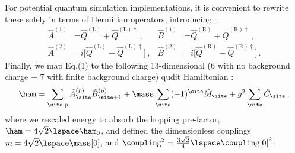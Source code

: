 \documentclass[aps,prl,reprint,twocolumn,superscriptaddress,floatfix,nofootinbib]{revtex4-2}
\begin{document}
For potential quantum simulation implementations, it is convenient to rewrite these solely in terms of Hermitian operators, introducing \cite{Calajo2024DigitalQuantumSimulation}:
\begin{equation}
    \begin{aligned}
        \hat{A}^{(1)} & \mathbin=\hat{Q}^{\mathrm{(L)}} \mathop+ \hat{Q}^{\mathrm{(L)}\dagger}\,,                 &
        \hat{B}^{(1)} & \mathbin=\hat{Q}^{\mathrm{(R)}} \mathop+ \hat{Q}^{\mathrm{(R)}\dagger}\,,                   \\
        \hat{A}^{(2)} & \mathbin= i \big[ \hat{Q}^{\mathrm{(L)}} \mathop- \hat{Q}^{\mathrm{(L)}\dagger} \big] \,, &
        \hat{B}^{(2)} & \mathbin= i \big[ \hat{Q}^{\mathrm{(R)}} \mathop- \hat{Q}^{\mathrm{(R)}\dagger} \big] \,.
    \end{aligned}
\end{equation}
Finally, we map Eq.(1) to the following 13-dimensional (6 with no background charge + 7 with finite background charge) qudit Hamiltonian \cite{Calajo2024DigitalQuantumSimulation}:
\begin{equation}
    \label{eq_Heff}
    \ham
    = \sum_{\site,p} \hat{A}^{(p)}_{\site} \hat{B}^{(p)}_{\site+1}
    + \mass \sum_{\site}(-1)^{\site} \hat{M}_{\site}
    + g^2 \sum_{\site} \hat{C}_{\site}\,,
\end{equation}
where we rescaled energy to absorb the hopping pre-factor, $\ham=4\sqrt{2}\lspace\ham_{0}$, and defined
the dimensionless couplings $m=4\sqrt{2}\lspace \mass[0]$, and $\coupling^{2}=\frac{3\sqrt{2}}{4}\lspace\coupling[0]^2$.
\end{document}
